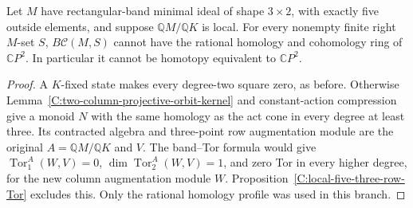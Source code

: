 \begin{corollary}
\label{C:local-five-two-column-act-cones}
Let $M$ have rectangular-band minimal ideal of shape $3\times2$,
with exactly five outside elements, and suppose
$\mathbb QM/\mathbb QK$ is local.
For every nonempty finite right $M$-set $S$,
$B\mathcal C(M,S)$ cannot have the rational homology and
cohomology ring of $\mathbb CP^2$.
In particular it cannot be homotopy equivalent to $\mathbb CP^2$.
\end{corollary}
\begin{proof}
A $K$-fixed state makes every degree-two square zero, as before.
Otherwise Lemma~\ref{C:two-column-projective-orbit-kernel} and
constant-action compression give a monoid $N$ with the same
homology as the act cone in every degree at least three.
Its contracted algebra and three-point row augmentation module
are the original $A=\mathbb QM/\mathbb QK$ and $V$.
The band--Tor formula would give
$\operatorname{Tor}_1^A(W,V)=0$,
$\dim\operatorname{Tor}_2^A(W,V)=1$, and zero Tor in every
higher degree, for the new column augmentation module $W$.
Proposition~\ref{C:local-five-three-row-Tor} excludes this.
Only the rational homology profile was used in this branch.
\end{proof}
